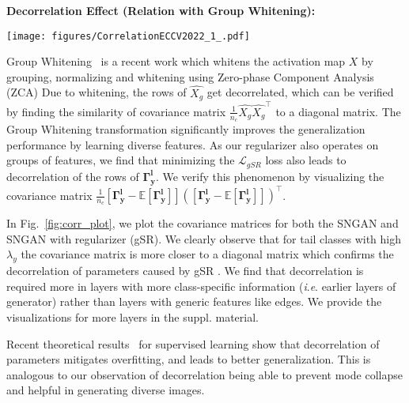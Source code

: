 \documentclass[runningheads,table]{llncs}
\newcommand{\ie}{\textit{i}.\textit{e}. }
\begin{document}
\noindent\textbf{Decorrelation Effect (Relation with Group Whitening):}
\begin{figure*}[t]    
    \centering
    \texttt{[image: figures/CorrelationECCV2022\_1\_.pdf]}
    \caption{\textbf{Covariance matrices of $\mathbf{\Gamma_y^l}$ for (l = 1) for SNGAN baseline.}  After using gSR (for tail classes with high $\lambda$) the covariance matrix converges to a diagonal matrix in comparison to without gSR (where large correlations exist). This demonstrates the decorrelation effect of gSR on $\mathbf{\gamma_y^l}$, which alleviates class-specific mode collapse.}
    \label{fig:corr_plot}
\end{figure*}
\label{sec:modecollapse}
Group Whitening~\cite{huang2021group} is a recent work which whitens the activation map $X$ by grouping, normalizing and whitening using Zero-phase Component Analysis (ZCA)  
Due to whitening, the rows of $\hat{X_g}$ get decorrelated, which can be verified by finding the similarity of covariance matrix $\frac{1}{n_c}\hat{X_g}\hat{X_g}^{\intercal}$ to a diagonal matrix. The Group Whitening transformation significantly improves the generalization performance by learning diverse features. As our regularizer also operates on groups of features, we find that minimizing the $\mathcal{L}_{gSR}$ loss also leads to decorrelation of the rows of $\mathbf{\Gamma_y^l}$. We verify this phenomenon by visualizing the covariance matrix $\frac{1}{n_c}[\mathbf{\Gamma_y^l} - \mathbb{E}[\mathbf{\Gamma_y^l}]] ([\mathbf{\Gamma_y^l} - \mathbb{E}[\mathbf{\Gamma_y^l}]])^{\intercal}$. 


In Fig.~\ref{fig:corr_plot}, we plot the covariance matrices for both the SNGAN and SNGAN with regularizer (gSR). We clearly observe that for tail classes with high $\lambda_y$ the covariance matrix is more closer to a diagonal matrix which confirms the decorrelation of parameters caused by gSR . 
We find that decorrelation is required more in layers with more class-specific information (\ie earlier layers of generator) rather than layers with generic features like edges. We provide the visualizations for more layers in the suppl. material. 

Recent theoretical results~\cite{wang2020mma,jin2020does} for supervised learning show that decorrelation of parameters mitigates overfitting, and leads to better generalization. This is analogous to our observation of decorrelation being able to prevent mode collapse and helpful in generating diverse images.
\end{document}
